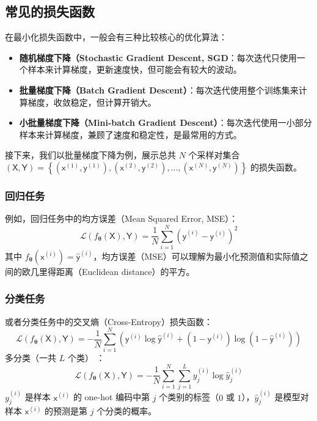 \subsection{常见的损失函数}

在最小化损失函数中，一般会有三种比较核心的优化算法：
\begin{itemize}
    \item \textbf{随机梯度下降（Stochastic Gradient Descent, SGD}：每次迭代只使用一个样本来计算梯度，更新速度快，但可能会有较大的波动。
    \item \textbf{批量梯度下降（Batch Gradient Descent）}：每次迭代使用整个训练集来计算梯度，收敛稳定，但计算开销大。
    \item \textbf{小批量梯度下降（Mini-batch Gradient Descent）}：每次迭代使用一小部分样本来计算梯度，兼顾了速度和稳定性，是最常用的方式。
\end{itemize}

接下来，我们以批量梯度下降为例，展示总共 \(N\) 个采样对集合 \(\left( \bm{\mathsf{X}}, \bm{\mathsf{Y}} \right) = \left\{ \left( \bm{\mathsf{x}}^{(1)}, \bm{\mathsf{y}}^{(1)} \right), \left( \bm{\mathsf{x}}^{(2)}, \bm{\mathsf{y}}^{(2)} \right), \dots, \left( \bm{\mathsf{x}}^{(N)}, \bm{\mathsf{y}}^{(N)} \right) \right\}\) 的损失函数。

\subsubsection{回归任务}

例如，回归任务中的均方误差（Mean Squared Error, MSE）：
\[
    \mathcal{L} \left( f_{\bm{\theta}} \left( \bm{\mathsf{X}} \right), \bm{\mathsf{Y}} \right) = \frac{1}{N} \sum_{i=1}^{N} \left( \hat{\bm{\mathsf{y}}}^{(i)} - \bm{\mathsf{y}}^{(i)} \right)^2
\]
其中 \(f_{\bm{\theta}} \left( \bm{\mathsf{x}}^{(i)} \right) = \hat{\bm{\mathsf{y}}}^{(i)}\)，均方误差（MSE）可以理解为最小化预测值和实际值之间的欧几里得距离（Euclidean distance）的平方。

\subsubsection{分类任务}

或者分类任务中的交叉熵（Cross-Entropy）损失函数：
\[
    \mathcal{L} \left( f_{\bm{\theta}} \left( \bm{\mathsf{X}} \right), \bm{\mathsf{Y}} \right) = -\frac{1}{N} \sum_{i=1}^{N} \left( \bm{\mathsf{y}}^{(i)} \log \hat{\bm{\mathsf{y}}}^{(i)} + \left( 1 - \bm{\mathsf{y}}^{(i)} \right) \log \left( 1 - \hat{\bm{\mathsf{y}}}^{(i)} \right) \right)
\]
多分类（一共 \(L\) 个类） ：
\begin{equation}\label{eq:cross_entropy_loss}
    \mathcal{L} \left( f_{\bm{\theta}} \left( \bm{\mathsf{X}} \right), \bm{\mathsf{Y}} \right) = -\frac{1}{N} \sum_{i=1}^{N} \sum_{j=1}^{L} y^{(i)}_{j} \log \hat{y}^{(i)}_{j}
\end{equation}
\(y^{(i)}_{j}\) 是样本 \(\bm{\mathsf{x}}^{(i)}\) 的 one-hot 编码中第 \(j\) 个类别的标签（\(0\) 或 \(1\)），\(\hat{y}^{(i)}_{j}\) 是模型对样本 \(\bm{\mathsf{x}}^{(i)}\) 的预测是第 \(j\) 个分类的概率。


